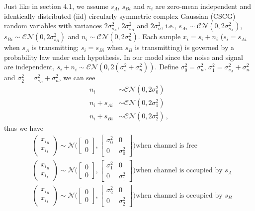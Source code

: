 Just like in section 4.1, 
we assume  $s_{Ai}$ $s_{Bi}$ and $n_i$ are zero-mean independent and identically distributed (iid) circularly symmetric complex Gaussian (CSCG) random variables with variances $2\sigma_{s_A}^2$, $2\sigma_{s_B}^2$ and $2\sigma_{n}^2$, i.e., $s_{Ai} \sim \mathcal{CN}(0, 2\sigma_{s_A}^2)$, $s_{Bi} \sim \mathcal{CN}(0, 2\sigma_{s_B}^2)$ and $n_i \sim \mathcal{CN}(0, 2\sigma_{n}^2)$.
Each sample $x_i = s_i + n_i$ ($s_i = s_{Ai}$ when $s_A$ is transmitting; $s_i = s_{Bi}$ when $s_B$ is transmitting) is governed by a probability law under each hypothesis. In our model
since the noise and signal are independent, $s_i+ n_i \sim \mathcal{CN}(0, 2(\sigma_{s}^2 + \sigma_n^2))$.  Define $\sigma_0^2 = \sigma_n^2$, $\sigma_1^2 = \sigma_{s_A}^2 + \sigma_n^2$ and $\sigma_2^2 = \sigma_{s_B}^2 + \sigma_n^2$, we can see
\begin{equation}
  \label{1129a1}
  \begin{split}
  n_i &\sim \mathcal{CN}(0, 2\sigma_0^2)\\
  n_i + s_{Ai} &\sim \mathcal{CN}(0, 2\sigma_1^2)\\
   n_i + s_{Bi}&\sim \mathcal{CN}(0, 2\sigma_2^2) \,,
  \end{split}
\end{equation}
thus we have 
\begin{equation}
   \begin{split}
     &\begin{pmatrix} x_{i_R} \\ x_{i_I} \end{pmatrix} \sim \mathcal{N}\Big( \begin{bmatrix} 0 \\ 0 \end{bmatrix}, \begin{bmatrix} \sigma_0^2 & 0\\ 0 & \sigma_0^2 \end{bmatrix} \Big) \text{when channel is free}\\
     &\begin{pmatrix} x_{i_R} \\ x_{i_I} \end{pmatrix} \sim \mathcal{N}\Big( \begin{bmatrix} 0 \\ 0 \end{bmatrix}, \begin{bmatrix} \sigma_1^2 & 0\\ 0 & \sigma_1^2 \end{bmatrix} \Big) \text{when channel is occupied by $s_A$}\\
     &\begin{pmatrix} x_{i_R} \\ x_{i_I} \end{pmatrix} \sim \mathcal{N}\Big( \begin{bmatrix} 0 \\ 0 \end{bmatrix}, \begin{bmatrix} \sigma_2^2 & 0\\ 0 & \sigma_2^2 \end{bmatrix} \Big) \text{when channel is occupied by $s_B$}
\end{split}
  \label{equ:xdistribution2}
\end{equation}
